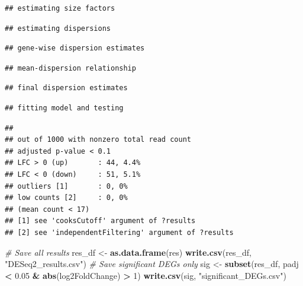 \documentclass[
]{article}
\newenvironment{Shaded}{\begin{snugshade}}{\end{snugshade}}
\newcommand{\CommentTok}[1]{\textcolor[rgb]{0.56,0.35,0.01}{\textit{#1}}}
\newcommand{\DecValTok}[1]{\textcolor[rgb]{0.00,0.00,0.81}{#1}}
\newcommand{\FloatTok}[1]{\textcolor[rgb]{0.00,0.00,0.81}{#1}}
\newcommand{\FunctionTok}[1]{\textcolor[rgb]{0.13,0.29,0.53}{\textbf{#1}}}
\newcommand{\NormalTok}[1]{#1}
\newcommand{\OtherTok}[1]{\textcolor[rgb]{0.56,0.35,0.01}{#1}}
\newcommand{\SpecialCharTok}[1]{\textcolor[rgb]{0.81,0.36,0.00}{\textbf{#1}}}
\newcommand{\StringTok}[1]{\textcolor[rgb]{0.31,0.60,0.02}{#1}}
\begin{document}
\begin{verbatim}
## estimating size factors
\end{verbatim}

\begin{verbatim}
## estimating dispersions
\end{verbatim}

\begin{verbatim}
## gene-wise dispersion estimates
\end{verbatim}

\begin{verbatim}
## mean-dispersion relationship
\end{verbatim}

\begin{verbatim}
## final dispersion estimates
\end{verbatim}

\begin{verbatim}
## fitting model and testing
\end{verbatim}

\begin{Shaded}
\end{Shaded}

\begin{verbatim}
## 
## out of 1000 with nonzero total read count
## adjusted p-value < 0.1
## LFC > 0 (up)       : 44, 4.4%
## LFC < 0 (down)     : 51, 5.1%
## outliers [1]       : 0, 0%
## low counts [2]     : 0, 0%
## (mean count < 17)
## [1] see 'cooksCutoff' argument of ?results
## [2] see 'independentFiltering' argument of ?results
\end{verbatim}

\begin{Shaded}
\begin{Highlighting}[]
\CommentTok{\# Save all results}
\NormalTok{res\_df }\OtherTok{\textless{}{-}} \FunctionTok{as.data.frame}\NormalTok{(res)}
\FunctionTok{write.csv}\NormalTok{(res\_df,}
  \StringTok{"DESeq2\_results.csv"}\NormalTok{)}
\CommentTok{\# Save significant DEGs only}
\NormalTok{sig }\OtherTok{\textless{}{-}} \FunctionTok{subset}\NormalTok{(res\_df, padj }\SpecialCharTok{\textless{}} \FloatTok{0.05} \SpecialCharTok{\&} \FunctionTok{abs}\NormalTok{(log2FoldChange) }\SpecialCharTok{\textgreater{}} \DecValTok{1}\NormalTok{)}
\FunctionTok{write.csv}\NormalTok{(sig,}
  \StringTok{"significant\_DEGs.csv"}\NormalTok{)}
\end{Highlighting}
\end{Shaded}
\end{document}
